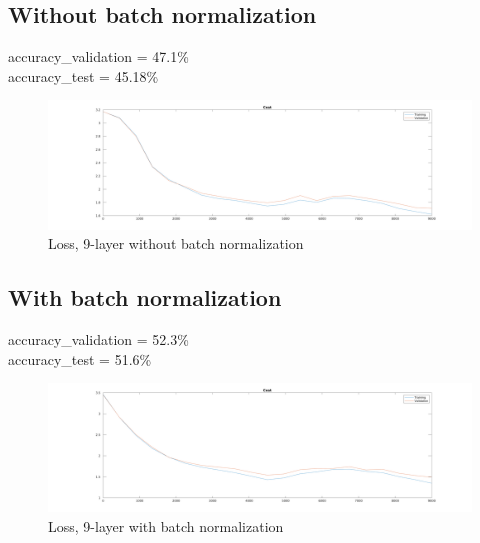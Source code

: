 \subsection{Without batch normalization}
accuracy\_validation = 47.1\%\\
accuracy\_test = 45.18\%
\begin{figure}[ht]
    \includegraphics[width=\textwidth]{../code/result_pics/cost_lambda=0.00500_ns=2250_cycles=2_k=9_bn=0.png}
    \caption{Loss, 9-layer without batch normalization}
\end{figure}

\subsection{With batch normalization}
accuracy\_validation = 52.3\%\\
accuracy\_test = 51.6\%
\begin{figure}[ht]
    \includegraphics[width=\textwidth]{../code/result_pics/cost_lambda=0.00500_ns=2250_cycles=2_k=9_bn=1.png}
    \caption{Loss, 9-layer with batch normalization}
\end{figure}
\clearpage

